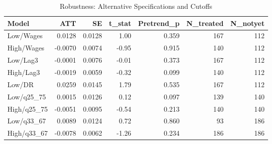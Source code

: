 \begin{table}[ht]
\centering
\begin{tabular}{lrrrrrr}
  \toprule
Model & ATT & SE & t\_stat & Pretrend\_p & N\_treated & N\_notyet \\ 
  \midrule
Low/Wages & 0.0128 & 0.0128 & 1.00 & 0.359 & 167 & 112 \\ 
  High/Wages & -0.0070 & 0.0074 & -0.95 & 0.915 & 140 & 112 \\ 
  Low/Lag3 & -0.0001 & 0.0076 & -0.01 & 0.373 & 167 & 112 \\ 
  High/Lag3 & -0.0019 & 0.0059 & -0.32 & 0.099 & 140 & 112 \\ 
  Low/DR & 0.0259 & 0.0145 & 1.79 & 0.535 & 167 & 112 \\ 
  Low/q25\_75 & 0.0015 & 0.0126 & 0.12 & 0.097 & 139 & 140 \\ 
  High/q25\_75 & -0.0051 & 0.0095 & -0.54 & 0.213 & 140 & 140 \\ 
  Low/q33\_67 & 0.0089 & 0.0124 & 0.72 & 0.860 & 93 & 186 \\ 
  High/q33\_67 & -0.0078 & 0.0062 & -1.26 & 0.234 & 186 & 186 \\ 
   \bottomrule
\end{tabular}
\caption{Robustness: Alternative Specifications and Cutoffs} 
\label{tab:robustness}
\end{table}
